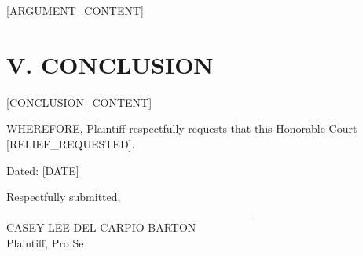 \documentclass[12pt]{article}
\begin{document}
[ARGUMENT_CONTENT]

\section*{V. CONCLUSION}

[CONCLUSION_CONTENT]

WHEREFORE, Plaintiff respectfully requests that this Honorable Court [RELIEF_REQUESTED].

\vspace{1cm}

Dated: [DATE]

\vspace{1cm}

\begin{flushright}
Respectfully submitted,\\
\vspace{1cm}
\_\_\_\_\_\_\_\_\_\_\_\_\_\_\_\_\_\_\_\_\_\_\_\_\_\_\_\_\_\_\\
CASEY LEE DEL CARPIO BARTON\\
Plaintiff, Pro Se\\
[ADDRESS]\\
[PHONE]\\
[EMAIL]
\end{flushright}
\end{document}
